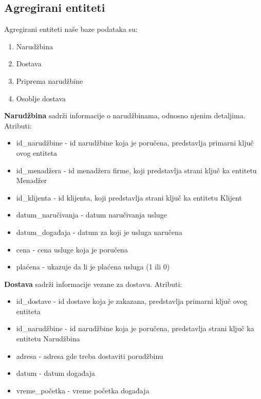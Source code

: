 \documentclass[a4paper]{article}
\begin{document}
\vspace{3mm}

\subsection{Agregirani entiteti}

Agregirani entiteti naše baze podataka su:
\begin{enumerate}
    \item Narudžbina
    \item Dostava
    \item Priprema narudžbine
    \item Osoblje dostava
\end{enumerate}


\vspace{3mm}

\textbf{Narudžbina} sadrži informacije o narudžbinama, odnosno njenim detaljima. Atributi:
\begin{itemize}
    \item id\_narudžbine - id narudžbine koja je poručena, predstavlja primarni ključ ovog entiteta
    \item id\_menadžera - id menadžera firme, koji predstavlja strani ključ ka entitetu Menadžer
    \item id\_klijenta - id klijenta, koji predstavlja strani ključ ka entitetu Klijent
    \item datum\_naručivanja - datum naručivanja usluge
    \item datum\_događaja - datum za koji je usluga naručena
    \item cena - cena usluge koja je poručena
    \item plaćena - ukazuje da li je plaćena usluga (1 ili 0)
    
\end{itemize}

\vspace{3mm}



\textbf{Dostava} sadrži informacije vezane za dostavu. Atributi:
\begin{itemize}
    \item id\_dostave - id dostave koja je zakazana, predstavlja primarni ključ ovog entiteta
    \item id\_narudžbine - id narudžbine koja je poručena, predstavlja strani ključ ka entitetu Narudžbina
    \item adresa - adresa gde treba dostaviti porudžbinu
    \item datum - datum događaja
    \item vreme\_početka - vreme početka događaja
    
\end{itemize}
\end{document}
